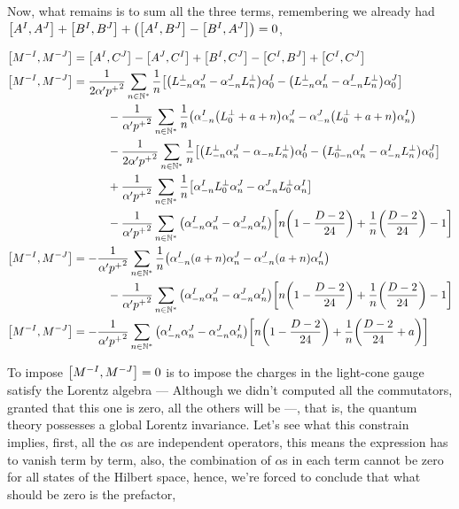 Now, what remains is to sum all the three terms, remembering we already had $\comm{A^I}{A^J}+\comm{B^I}{B^J}+\qty(\comm{A^I}{B^J}-\comm{B^I}{A^J})=0$,

\begin{align*}
    \comm{M^{-I}}{M^{-J}}&=\comm{A^I}{C^J}-\comm{A^J}{C^I}+\comm{B^I}{C^J}-\comm{C^I}{B^J}+\comm{C^I}{C^J}\\
    \comm{M^{-I}}{M^{-J}}&=\frac{1}{2\alpha'{p^+}^2}\sum\limits_{n\in\mathbb N^\ast}\frac1n\qty[\qty(L^\perp_{-n}\alpha_n^J-\alpha_{-n}^JL^\perp_{n})\alpha^I_0-\qty(L^\perp_{-n}\alpha_n^I-\alpha_{-n}^IL^\perp_{n})\alpha^J_0]\\
    &\quad\quad\quad-\frac{1}{\alpha'{p^+}^2}\sum\limits_{n\in\mathbb N^\ast}\frac1n\qty(\alpha_{-n}^I\qty(L_0^\perp +a+n)\alpha_n^J-\alpha_{-n}^J\qty(L^\perp_0+a+n)\alpha_n^I)\\
    &\quad\quad\quad-\frac{1}{2\alpha'{p^+}^2}\sum\limits_{n\in\mathbb N^\ast}\frac{1}{n}\qty[\qty(L^\perp_{-n}\alpha^J_n-\alpha_{-n}L^\perp_n)\alpha_0^I-\qty(L^\perp_{0-n}\alpha^I_n-\alpha^I_{-n}L^\perp_n)\alpha^J_{0}]\\
    &\quad\quad\quad+\frac{1}{ \alpha'{p^+}^2}\sum\limits_{n\in\mathbb N^\ast}\frac1n\qty[\alpha^I_{-n}L^\perp_{0}\alpha_n^J-\alpha^J_{-n}L^\perp_{0}\alpha_n^I]\\
    &\quad\quad\quad-\frac{1}{\alpha'{p^+}^2}\sum\limits_{n\in\mathbb N^\ast}\qty(\alpha^I_{-n}\alpha^J_n-\alpha^J_{-n}\alpha^I_n)\qty[n\qty(1-\frac{D-2}{24})+\frac1n\qty(\frac{D-2}{24})-1]\\
    \comm{M^{-I}}{M^{-J}}&=-\frac{1}{\alpha'{p^+}^2}\sum\limits_{n\in\mathbb N^\ast}\frac1n\qty(\alpha_{-n}^I\qty(a+n)\alpha_n^J-\alpha_{-n}^J\qty(a+n)\alpha_n^I)\\
    &\quad\quad\quad-\frac{1}{\alpha'{p^+}^2}\sum\limits_{n\in\mathbb N^\ast}\qty(\alpha^I_{-n}\alpha^J_n-\alpha^J_{-n}\alpha^I_n)\qty[n\qty(1-\frac{D-2}{24})+\frac1n\qty(\frac{D-2}{24})-1]\\
    \comm{M^{-I}}{M^{-J}}&=-\frac{1}{\alpha'{p^+}^2}\sum\limits_{n\in\mathbb N^\ast}\qty(\alpha^I_{-n}\alpha^J_n-\alpha^J_{-n}\alpha^I_n)\qty[n\qty(1-\frac{D-2}{24})+\frac1n\qty(\frac{D-2}{24}+a)]
\end{align*}

To impose $\comm{M^{-I}}{M^{-J}}=0$ is to impose the charges in the light-cone gauge satisfy the Lorentz algebra --- Although we didn't computed all the commutators, granted that this one is zero, all the others will be ---, that is,
the quantum theory possesses a global Lorentz invariance. Let's see what this constrain implies, first, all the $\alpha$s are independent operators, this means the expression has to vanish 
term by term, also, the combination of $\alpha$s in each term cannot be zero for all states of the Hilbert space, hence, we're forced to conclude that what should be zero is the prefactor,

